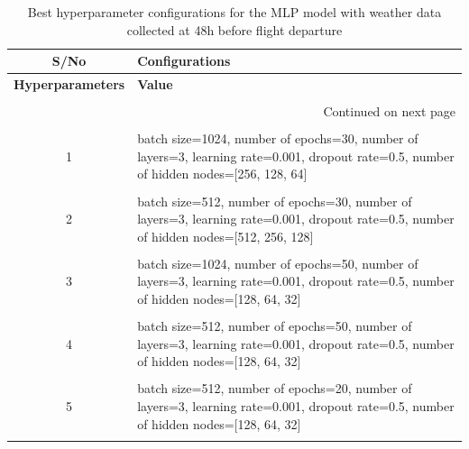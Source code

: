 \documentclass[12pt,oneside]{book} %
\begin{document}
\setlength\LTleft{-0.5cm}
\begin{longtable}{c p{13cm}}
\caption{ Best hyperparameter configurations for the MLP model with weather data collected at 48h before flight departure} \label{tab:MLP_hyperparameters_config_48h} 
\\\hline
\textbf{S/No} & \textbf{Configurations} \\ \hline
\endfirsthead

\hline
\textbf{Hyperparameters} & \textbf{Value}  \\ \hline
&\\
\endhead

\hline \multicolumn{2}{r}{{Continued on next page}} \\ \hline
\endfoot

\hline
\endlastfoot
\\
1 & batch size=1024, number of epochs=30, number of layers=3, learning rate=0.001, dropout rate=0.5, number of hidden nodes=[256, 128, 64]\\
&\\
2 & batch size=512, number of epochs=30, number of layers=3, learning rate=0.001, dropout rate=0.5, number of hidden nodes=[512, 256, 128]\\ 
&\\
3 & batch size=1024, number of epochs=50, number of layers=3, learning rate=0.001, dropout rate=0.5, number of hidden nodes=[128, 64, 32]\\
&\\
4 & batch size=512, number of epochs=50, number of layers=3, learning rate=0.001, dropout rate=0.5, number of hidden nodes=[128, 64, 32]\\ 
&\\
5 & batch size=512, number of epochs=20, number of layers=3, learning rate=0.001, dropout rate=0.5, number of hidden nodes=[128, 64, 32]\\
&\\
\end{longtable}
\end{document}
